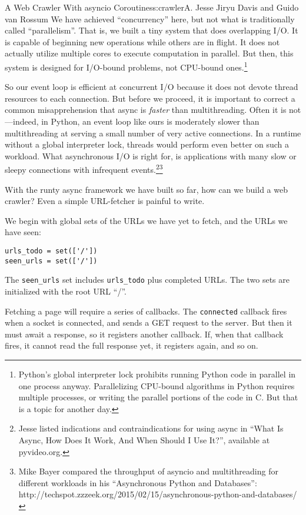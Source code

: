 \begin{aosachapter}{A Web Crawler With asyncio Coroutines}{s:crawler}{A. Jesse Jiryu Davis and Guido van Rossum}
We have achieved ``concurrency'' here, but not what is traditionally
called ``parallelism''. That is, we built a tiny system that does
overlapping I/O. It is capable of beginning new operations while others
are in flight. It does not actually utilize multiple cores to execute
computation in parallel. But then, this system is designed for I/O-bound
problems, not CPU-bound ones.\footnote{Python's global interpreter lock
  prohibits running Python code in parallel in one process anyway.
  Parallelizing CPU-bound algorithms in Python requires multiple
  processes, or writing the parallel portions of the code in C. But that
  is a topic for another day.}

So our event loop is efficient at concurrent I/O because it does not
devote thread resources to each connection. But before we proceed, it is
important to correct a common misapprehension that async is
\emph{faster} than multithreading. Often it is not---indeed, in Python,
an event loop like ours is moderately slower than multithreading at
serving a small number of very active connections. In a runtime without
a global interpreter lock, threads would perform even better on such a
workload. What asynchronous I/O is right for, is applications with many
slow or sleepy connections with infrequent events.\footnote{Jesse listed
  indications and contraindications for using async in ``What Is Async,
  How Does It Work, And When Should I Use It?'', available at
  pyvideo.org.}\footnote{Mike Bayer compared the throughput of asyncio
  and multithreading for different workloads in his ``Asynchronous
  Python and Databases'':
  http://techspot.zzzeek.org/2015/02/15/asynchronous-python-and-databases/}

\label{programming-with-callbacks}

With the runty async framework we have built so far, how can we build a
web crawler? Even a simple URL-fetcher is painful to write.

We begin with global sets of the URLs we have yet to fetch, and the URLs
we have seen:

\begin{verbatim}
urls_todo = set(['/'])
seen_urls = set(['/'])
\end{verbatim}

The \texttt{seen\_urls} set includes \texttt{urls\_todo} plus completed
URLs. The two sets are initialized with the root URL ``/''.

Fetching a page will require a series of callbacks. The
\texttt{connected} callback fires when a socket is connected, and sends
a GET request to the server. But then it must await a response, so it
registers another callback. If, when that callback fires, it cannot read
the full response yet, it registers again, and so on.


\end{aosachapter}
